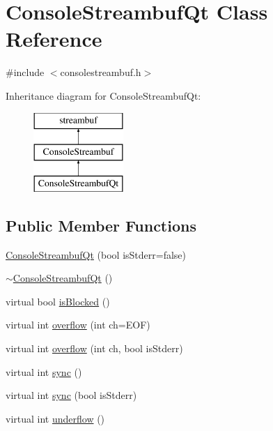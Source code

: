 \hypertarget{classsgl_1_1qtgui_1_1ConsoleStreambufQt}{}\section{Console\+Streambuf\+Qt Class Reference}
\label{classsgl_1_1qtgui_1_1ConsoleStreambufQt}


{\ttfamily \#include $<$consolestreambuf.\+h$>$}

Inheritance diagram for Console\+Streambuf\+Qt\+:\begin{figure}[H]
\begin{center}
\leavevmode
\includegraphics[height=3.000000cm]{classsgl_1_1qtgui_1_1ConsoleStreambufQt}
\end{center}
\end{figure}
\subsection*{Public Member Functions}
\begin{DoxyCompactItemize}
\item 
\mbox{\hyperlink{classsgl_1_1qtgui_1_1ConsoleStreambufQt_a98660042e1f344d995a0e2e80daee3e9}{Console\+Streambuf\+Qt}} (bool is\+Stderr=false)
\item 
\mbox{\hyperlink{classsgl_1_1qtgui_1_1ConsoleStreambufQt_a04fd32aefbdede618e4f890306abd951}{$\sim$\+Console\+Streambuf\+Qt}} ()
\item 
virtual bool \mbox{\hyperlink{classsgl_1_1ConsoleStreambuf_a61d5d93ba4956eefeb2e3d617d34c801}{is\+Blocked}} ()
\item 
virtual int \mbox{\hyperlink{classsgl_1_1ConsoleStreambuf_adccb3cd5475ba3c83bc2b0a8cbd731c0}{overflow}} (int ch=E\+OF)
\item 
virtual int \mbox{\hyperlink{classsgl_1_1ConsoleStreambuf_a5cfed6bdc955e2129ced962625045f8e}{overflow}} (int ch, bool is\+Stderr)
\item 
virtual int \mbox{\hyperlink{classsgl_1_1ConsoleStreambuf_a810a727ce5554d3178e17b6bc55025dd}{sync}} ()
\item 
virtual int \mbox{\hyperlink{classsgl_1_1ConsoleStreambuf_ad5f4344df2a20a0000adb05d4e656855}{sync}} (bool is\+Stderr)
\item 
virtual int \mbox{\hyperlink{classsgl_1_1ConsoleStreambuf_aeb6918bd44153b257e097e2d2ef370ef}{underflow}} ()
\end{DoxyCompactItemize}

